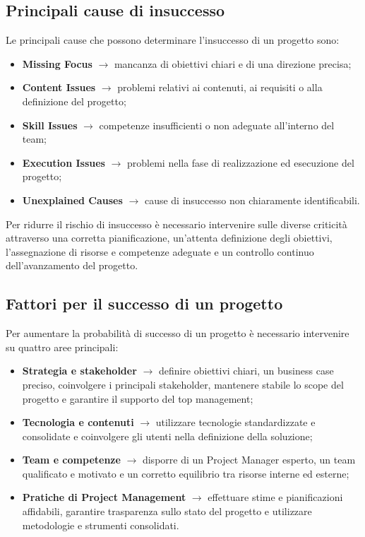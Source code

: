 \subsection{Principali cause di insuccesso}
Le principali cause che possono determinare l'insuccesso di un progetto sono:
\begin{itemize}
    \item \textbf{Missing Focus} $\rightarrow$ mancanza di obiettivi chiari e di una direzione precisa;
    \item \textbf{Content Issues} $\rightarrow$ problemi relativi ai contenuti, ai requisiti o alla definizione del progetto;
    \item \textbf{Skill Issues} $\rightarrow$ competenze insufficienti o non adeguate all'interno del team;
    \item \textbf{Execution Issues} $\rightarrow$ problemi nella fase di realizzazione ed esecuzione del progetto;
    \item \textbf{Unexplained Causes} $\rightarrow$ cause di insuccesso non chiaramente identificabili.
\end{itemize}

\noindent Per ridurre il rischio di insuccesso è necessario intervenire sulle diverse criticità attraverso una corretta pianificazione, 
un'attenta definizione degli obiettivi, l'assegnazione di risorse e competenze adeguate e un controllo continuo dell'avanzamento del progetto.
\subsection{Fattori per il successo di un progetto}
Per aumentare la probabilità di successo di un progetto è necessario intervenire su quattro aree principali:
\begin{itemize}
    \item \textbf{Strategia e stakeholder} $\rightarrow$ definire obiettivi chiari, un business case preciso, 
    coinvolgere i principali stakeholder, mantenere stabile lo scope del progetto e garantire il supporto del top management;
    \item \textbf{Tecnologia e contenuti} $\rightarrow$ utilizzare tecnologie standardizzate e consolidate e coinvolgere gli utenti 
    nella definizione della soluzione;
    \item \textbf{Team e competenze} $\rightarrow$ disporre di un Project Manager esperto, un team qualificato e motivato e un corretto 
    equilibrio tra risorse interne ed esterne;
    \item \textbf{Pratiche di Project Management} $\rightarrow$ effettuare stime e pianificazioni affidabili, garantire trasparenza sullo 
    stato del progetto e utilizzare metodologie e strumenti consolidati.
\end{itemize}

